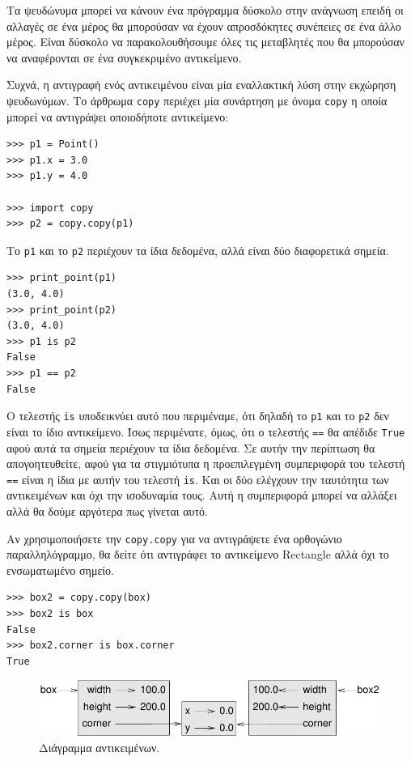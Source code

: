 \documentclass[10pt]{book}
\begin{document}
Τα ψευδώνυμα μπορεί να κάνουν ένα πρόγραμμα δύσκολο στην ανάγνωση επειδή οι αλλαγές σε ένα μέρος
θα μπορούσαν να έχουν απροσδόκητες συνέπειες σε ένα άλλο μέρος. Είναι δύσκολο να παρακολουθήσουμε
όλες τις μεταβλητές που θα μπορούσαν να αναφέρονται σε ένα συγκεκριμένο αντικείμενο.

Συχνά, η αντιγραφή ενός αντικειμένου είναι μία εναλλακτική λύση στην εκχώρηση ψευδωνύμων. Το άρθρωμα
{\tt copy} περιέχει μία συνάρτηση με όνομα {\tt copy} η οποία μπορεί να αντιγράψει οποιοδήποτε αντικείμενο:

\begin{verbatim}
>>> p1 = Point()
>>> p1.x = 3.0
>>> p1.y = 4.0

>>> import copy
>>> p2 = copy.copy(p1)
\end{verbatim}
%
Το {\tt p1} και το {\tt p2} περιέχουν τα ίδια δεδομένα, αλλά είναι δύο διαφορετικά σημεία.  

\begin{verbatim}
>>> print_point(p1)
(3.0, 4.0)
>>> print_point(p2)
(3.0, 4.0)
>>> p1 is p2
False
>>> p1 == p2
False
\end{verbatim}
%
Ο τελεστής {\tt is} υποδεικνύει αυτό που περιμέναμε, ότι δηλαδή το {\tt p1} και το {\tt p2} δεν είναι το ίδιο
αντικείμενο. Ίσως περιμένατε, όμως, ότι ο τελεστής {\tt ==} θα απέδιδε {\tt True} αφού αυτά τα σημεία περιέχουν
τα ίδια δεδομένα. Σε αυτήν την περίπτωση θα απογοητευθείτε, αφού για τα στιγμιότυπα η προεπιλεγμένη συμπεριφορά
του τελεστή {\tt ==} είναι η ίδια με αυτήν του τελεστή {\tt is}. Και οι δύο ελέγχουν την ταυτότητα των αντικειμένων και όχι την ισοδυναμία τους. Αυτή η συμπεριφορά μπορεί να αλλάξει αλλά θα δούμε αργότερα πως γίνεται αυτό.

Αν χρησιμοποιήσετε την {\tt copy.copy} για να αντιγράψετε ένα ορθογώνιο παραλληλόγραμμο, θα δείτε ότι αντιγράφει
το αντικείμενο Rectangle αλλά όχι το ενσωματωμένο σημείο. 

\begin{verbatim}
>>> box2 = copy.copy(box)
>>> box2 is box
False
>>> box2.corner is box.corner
True
\end{verbatim}

\begin{figure}
\centerline
{\includegraphics[scale=0.8]{figs/rectangle2.pdf}}
 \caption{Διάγραμμα αντικειμένων.} 
\label{fig.rectangle2}
\end{figure}
\end{document}
